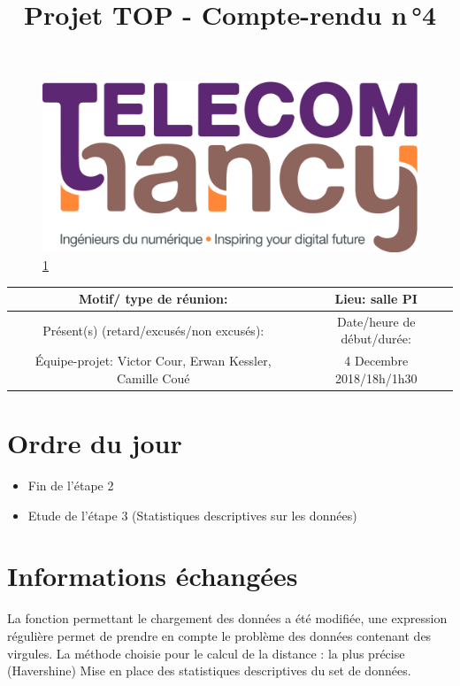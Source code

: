 \documentclass{article}
\date{}
\begin{document}
\begin{figure}
    \centering
    \includegraphics[scale=0.05]{logo_TNCY.png}
    \label{fig:logo_tncy}
    \ref{fig:logo_tncy}
\end{figure}
\title{Projet TOP - Compte-rendu n\,°4}
\maketitle
\vspace*{-1cm}

\begin{tabular}{|c|c|}
  \hline
  Motif/ type de réunion: & Lieu: salle PI \\
  \hline
   Présent(s) (retard/excusés/non excusés): &  Date/heure de début/durée:\\
  Équipe-projet: Victor Cour,
                  Erwan Kessler,
                  Camille Coué
 & 4 Decembre 2018/18h/1h30 \\
  \hline
\end{tabular}


\section{Ordre du jour}
\begin{itemize}
  \item Fin de l'étape 2
  \item Etude de l'étape 3 (Statistiques descriptives sur les données)
\end{itemize}
\section{Informations échangées}
La fonction permettant le chargement des données a été modifiée, une expression régulière permet de prendre en compte le problème des données contenant des virgules.
\newline La méthode choisie pour le calcul de la distance : la plus précise (Havershine)
Mise en place des statistiques descriptives du set de données. 
\end{document}
